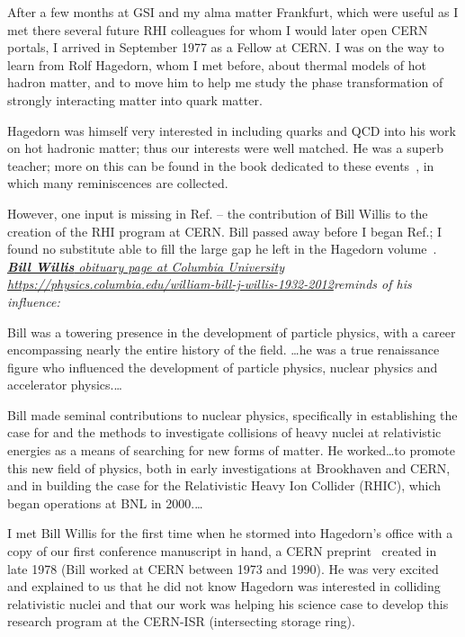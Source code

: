 After a few months at GSI and my alma matter Frankfurt, which were useful as I met there several future RHI colleagues for whom I would later open CERN portals, I arrived in September 1977 as a Fellow at CERN. I was on the way to learn from Rolf Hagedorn, whom I met before, about thermal models of hot hadron matter, and to move him to help me study the phase transformation of strongly interacting matter into quark matter. 

Hagedorn was himself very interested in including quarks and QCD into his work on hot hadronic matter; thus our interests were well matched. He was a superb teacher; more on this can be found in the book dedicated to these events~\cite{Rafelski:2016hnq}, in which many reminiscences are collected. 

However, one input is missing in Ref.\cite{Rafelski:2016hnq} -- the contribution of Bill Willis to the creation of the RHI program at CERN. Bill passed away before I began Ref.\cite{Rafelski:2016hnq}; I found no substitute able to fill the large gap he left in the Hagedorn volume~\cite{Rafelski:2016hnq}.\\

\noindent \textit{\href{https://physics.columbia.edu/william-bill-j-willis-1932-2012}{\textbf{Bill Willis} obituary page at Columbia University} \url{https://physics.columbia.edu/william-bill-j-willis-1932-2012}reminds of his influence:}\\[-0.7cm]
%
\begin{mdframed}[linecolor=gray,roundcorner=12pt,backgroundcolor=GreenYellow!15,linewidth=1pt,leftmargin=0cm,rightmargin=0cm,topline=true,bottomline=true,skipabove=12pt]\relax%
%
Bill was a towering presence in the development of particle physics, with a career encompassing nearly the entire history of the field. \ldots he was a true renaissance figure who influenced the development of particle physics, nuclear physics and accelerator physics.\ldots

Bill made seminal contributions to nuclear physics, specifically in establishing the case for and the methods to investigate collisions of heavy nuclei at relativistic energies as a means of searching for new forms of matter. He worked\ldots to promote this new field of physics, both in early investigations at Brookhaven and CERN, and in building the case for the Relativistic Heavy Ion Collider (RHIC), which began operations at BNL in 2000.\ldots
\end{mdframed}
\vskip 0.5cm

I met Bill Willis for the first time when he stormed into Hagedorn\rq s office with a copy of our first conference manuscript in hand, a CERN preprint~\cite{Hagedorn:1978kc} created in late 1978 (Bill worked at CERN between 1973 and 1990). He was very excited and explained to us that he did not know Hagedorn was interested in colliding relativistic nuclei and that our work was helping his science case to develop this research program at the CERN-ISR (intersecting storage ring).

